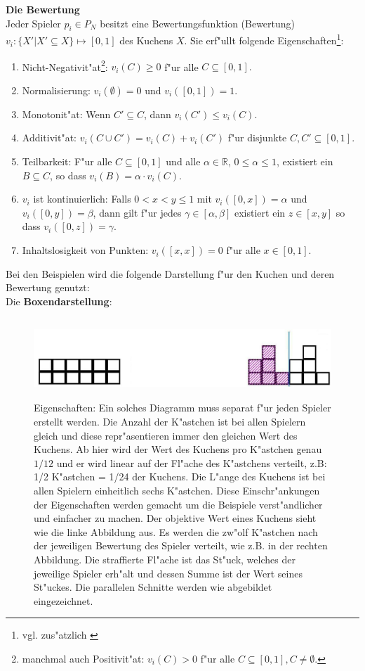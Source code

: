 \documentclass[11pt, a4paper, twoside]{article}
\numberwithin{equation}{section}
\begin{document}
\newline
\textbf{Die Bewertung} \\
\newline
Jeder Spieler $p_i \in P_N$ besitzt eine Bewertungsfunktion (Bewertung) $v_i:\{X'|X'\subseteq X\}\mapsto [0,1]$ des Kuchens $X$. Sie erf"ullt folgende Eigenschaften\footnote{vgl. zus"atzlich \cite{24}}:
\begin{enumerate}
\item Nicht-Negativit"at\footnote{manchmal auch Positivit"at: $v_i(C)> 0$ f"ur alle $C\subseteq [0,1], C \neq \emptyset.$}: $v_i(C)\geq 0$ f"ur alle $C\subseteq [0,1].$
\item Normalisierung: $v_i(\emptyset)=0$ und $v_i([0,1])=1.$
\item Monotonit"at: Wenn $C' \subseteq C$, dann $v_i(C') \leq v_i(C).$
\item Additivit"at: $v_i(C \cup C')=v_i(C)+v_i(C')$ f"ur disjunkte $C,C'\subseteq [0,1].$
\item Teilbarkeit: F"ur alle $C\subseteq [0,1]$ und alle $\alpha \in \mathbb{R}$, $0\leq \alpha \leq 1$, existiert ein $B\subseteq C$, so dass  $v_i(B)=\alpha \cdot v_i(C).$
\item  $v_i$ ist kontinuierlich: Falls $0<x<y\leq 1$ mit $v_i([0,x])=\alpha$ und $v_i([0,y])=\beta$, dann gilt f"ur jedes $\gamma \in [\alpha,\beta]$ existiert ein $z \in [x,y]$ so dass $v_i([0,z])=\gamma.$
\item Inhaltslosigkeit von Punkten:  $v_i([x,x])=0$ f"ur alle $x\in [0,1].$
\end{enumerate}
Bei den Beispielen wird die folgende Darstellung f"ur den Kuchen und deren Bewertung genutzt:\\
\newline
Die \textbf{Boxendarstellung}:
\begin{figure}[h!]
\center
 \includegraphics[height=3cm]{cc1svv.jpg}
\caption[Beispiel f"ur die Boxendarstellung eines Kuchens]{Eigenschaften: Ein solches Diagramm muss separat f"ur jeden Spieler erstellt werden. Die Anzahl der K"astchen ist bei allen Spielern gleich und diese repr"asentieren immer den gleichen Wert des Kuchens. Ab hier wird der Wert des Kuchens pro K"astchen genau $1/12$ und er wird linear auf der Fl"ache des K"astchens verteilt, z.B: 1/2 K"astchen = 1/24 der Kuchens. Die L"ange des Kuchens ist bei allen Spielern einheitlich sechs K"astchen. Diese Einschr"ankungen der Eigenschaften werden gemacht um die Beispiele verst"andlicher und einfacher zu machen. Der objektive Wert eines Kuchens sieht wie die linke Abbildung aus. Es werden die zw"olf K"astchen nach der jeweiligen Bewertung des Spieler verteilt, wie z.B. in der rechten Abbildung. Die straffierte Fl"ache ist das St"uck, welches der jeweilige Spieler erh"alt und dessen Summe ist der Wert seines St"uckes. Die parallelen Schnitte werden wie abgebildet eingezeichnet.}
\end{figure}
\end{document}
